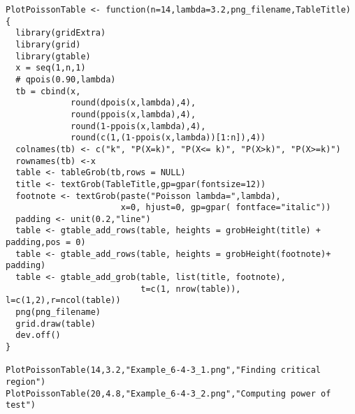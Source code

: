 \begin{frame}[fragile]
\begin{lstlisting}[title=The {\it R} code to produce the previous two Poisson tables.]
PlotPoissonTable <- function(n=14,lambda=3.2,png_filename,TableTitle) {
  library(gridExtra)
  library(grid)
  library(gtable)
  x = seq(1,n,1)
  # qpois(0.90,lambda)
  tb = cbind(x,
             round(dpois(x,lambda),4),
             round(ppois(x,lambda),4),
             round(1-ppois(x,lambda),4),
             round(c(1,(1-ppois(x,lambda))[1:n]),4))
  colnames(tb) <- c("k", "P(X=k)", "P(X<= k)", "P(X>k)", "P(X>=k)")
  rownames(tb) <-x
  table <- tableGrob(tb,rows = NULL)
  title <- textGrob(TableTitle,gp=gpar(fontsize=12))
  footnote <- textGrob(paste("Poisson lambda=",lambda),
                       x=0, hjust=0, gp=gpar( fontface="italic"))
  padding <- unit(0.2,"line")
  table <- gtable_add_rows(table, heights = grobHeight(title) + padding,pos = 0)
  table <- gtable_add_rows(table, heights = grobHeight(footnote)+ padding)
  table <- gtable_add_grob(table, list(title, footnote),
                           t=c(1, nrow(table)), l=c(1,2),r=ncol(table))
  png(png_filename)
  grid.draw(table)
  dev.off()
}

PlotPoissonTable(14,3.2,"Example_6-4-3_1.png","Finding critical region")
PlotPoissonTable(20,4.8,"Example_6-4-3_2.png","Computing power of test")
\end{lstlisting}
\end{frame}
